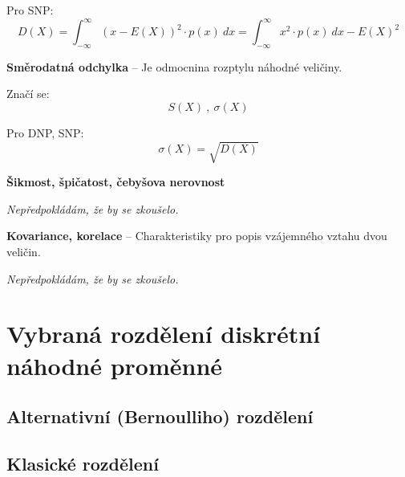\begin{compactitem}
\begin{compactitem}
        \item Pro SNP:
        $$ D(X) = \int_{-\infty}^\infty {\left( x - E(X) \right)}^2 \cdot p(x) ~ dx = \int_{-\infty}^\infty x^2 \cdot p(x) ~ dx - E(X)^2 $$
    \end{compactitem}

    \item \textbf{Směrodatná odchylka} -- Je odmocnina rozptylu náhodné veličiny. \begin{compactitem}
        \item Značí se:
        $$ S(X) ~,~ \sigma(X) $$

        \item Pro DNP, SNP:
        $$ \sigma(X) = \sqrt{D(X)} $$
    \end{compactitem}

    \item \textbf{Šikmost, špičatost, čebyšova nerovnost} \begin{compactitem}
        \item \textit{Nepředpokládám, že by se zkoušelo.}
    \end{compactitem}

    \item \textbf{Kovariance, korelace} -- Charakteristiky pro popis vzájemného vztahu dvou veličin. \begin{compactitem}
        \item \textit{Nepředpokládám, že by se zkoušelo.}
    \end{compactitem}
\end{compactitem}


\section{Vybraná rozdělení diskrétní náhodné proměnné}

\subsection{Alternativní (Bernoulliho) rozdělení}


\subsection{Klasické rozdělení}


